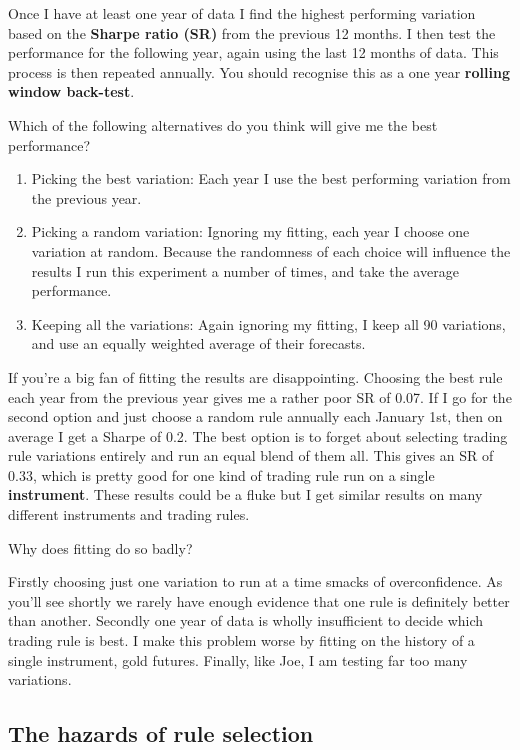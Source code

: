 Once I have at least one year of data I find the highest performing variation based on the \textbf{Sharpe ratio (SR)} from the previous 12 months. I then test the performance for the following year, again using the last 12 months of data. This process is then repeated annually. You should recognise this as a one year \textbf{rolling window back-test}.

Which of the following alternatives do you think will give me the best performance?

\begin{enumerate}
\item Picking the best variation: Each year I use the best performing variation from the previous year.
\item Picking a random variation: Ignoring my fitting, each year I choose one variation at random. Because the randomness of each choice will influence the results I run this experiment a number of times, and take the average performance.
\item Keeping all the variations: Again ignoring my fitting, I keep all 90 variations, and use an equally weighted average of their forecasts. \end{enumerate}

If you're a big fan of fitting the results are disappointing. Choosing the best rule each year from the previous year gives me a rather poor SR of 0.07. If I go for the second option and just choose a random rule annually each January 1st, then on average I get a Sharpe of 0.2. The best option is to forget about selecting trading rule variations entirely and run an equal blend of them all. This gives an SR of 0.33, which is pretty good for one kind of trading rule run on a single \textbf{instrument}. These results could be a fluke but I get similar results on many different instruments and trading rules.

Why does fitting do so badly?

Firstly choosing just one variation to run at a time smacks of overconfidence. As you'll see shortly we rarely have enough evidence that one rule is definitely better than another. Secondly one year of data is wholly insufficient to decide which trading rule is best. I make this problem worse by fitting on the history of a single instrument, gold futures. Finally, like Joe, I am testing far too many variations.

\subsection*{The hazards of rule selection}

